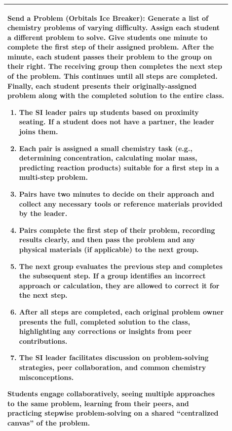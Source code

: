 \documentclass{article}
\begin{document}
\begin{tabular}{|p{0.9\linewidth}|}
\hline
\vspace{0.2cm}
\textbf{Send a Problem (Orbitals Ice Breaker):}
Generate a list of chemistry problems of varying difficulty. Assign each student a different problem to solve. Give students one minute to complete the first step of their assigned problem. After the minute, each student passes their problem to the group on their right. The receiving group then completes the next step of the problem. This continues until all steps are completed. Finally, each student presents their originally-assigned problem along with the completed solution to the entire class.

\begin{enumerate}
\item The SI leader pairs up students based on proximity seating. If a student does not have a partner, the leader joins them.
\item Each pair is assigned a small chemistry task (e.g., determining concentration, calculating molar mass, predicting reaction products) suitable for a first step in a multi-step problem.
\item Pairs have two minutes to decide on their approach and collect any necessary tools or reference materials provided by the leader.
\item Pairs complete the first step of their problem, recording results clearly, and then pass the problem and any physical materials (if applicable) to the next group.
\item The next group evaluates the previous step and completes the subsequent step. If a group identifies an incorrect approach or calculation, they are allowed to correct it for the next step.
\item After all steps are completed, each original problem owner presents the full, completed solution to the class, highlighting any corrections or insights from peer contributions.
\item The SI leader facilitates discussion on problem-solving strategies, peer collaboration, and common chemistry misconceptions.
\end{enumerate}

Students engage collaboratively, seeing multiple approaches to the same problem, learning from their peers, and practicing stepwise problem-solving on a shared “centralized canvas” of the problem.\\
\hline
\end{tabular}
\end{document}
